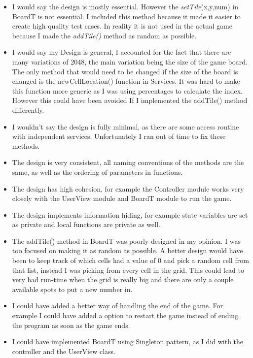 \documentclass[12pt]{article}
\begin{document}
\begin{itemize}

    \item I would say the design is mostly essential. However the \textit{setTile}(x,y,num) in BoardT is not essential. I included this method because it made it easier to create high quality test cases. In reality it is not used in the actual game because I made the \textit{addTile()} method as random as possible.
    
    \item I would say my Design is general, I accounted for the fact that there are many variations of 2048, the main variation being the size of the game board. The only method that would need to be changed if the size of the board is changed is the newCellLocation() function in Services. It was hard to make this function more generic as I was using percentages to calculate the index. However this could have been avoided If I implemented the addTile() method differently.
    
    \item I wouldn't say the design is fully minimal, as there are some access routine with independent services. Unfortunately I ran out of time to fix these methods. 
    
    \item The design is very consistent, all naming conventions of the methods are the same, as well as the ordering of parameters in functions.
    \item The design has high cohesion, for example the Controller module works very closely with the UserView module and BoardT module to run the game. 
    \item The design implements information hiding, for example state variables are set as private and local functions are private as well.
    
    \item The addTile() method in BoardT was poorly designed in my opinion. I was too focused on making it as random as possible. A better design would have been to keep track of which cells had a value of 0 and pick a random cell from that list, instead I was picking from every cell in the grid. This could lead to very bad run-time when the grid is really big and there are only a couple available spots to put a new number in.
    \item I could have added a better way of handling the end of the game. For example I could have added a option to restart the game instead of ending the program as soon as the game ends.
    \item I could have implemented BoardT using Singleton pattern, as I did with the controller and the UserView class.


\end{itemize}
\end{document}
